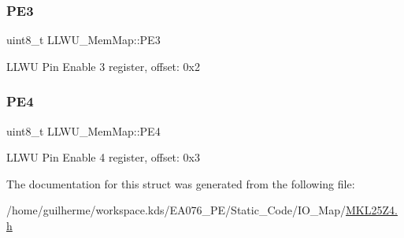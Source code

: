 \subsubsection{\texorpdfstring{P\+E3}{PE3}}
{\footnotesize\ttfamily uint8\+\_\+t L\+L\+W\+U\+\_\+\+Mem\+Map\+::\+P\+E3}

L\+L\+WU Pin Enable 3 register, offset\+: 0x2 \mbox{\label{struct_l_l_w_u___mem_map_a61ec3534039e161c5c71ea7f290f23d5}} 
\subsubsection{\texorpdfstring{P\+E4}{PE4}}
{\footnotesize\ttfamily uint8\+\_\+t L\+L\+W\+U\+\_\+\+Mem\+Map\+::\+P\+E4}

L\+L\+WU Pin Enable 4 register, offset\+: 0x3 

The documentation for this struct was generated from the following file\+:\begin{DoxyCompactItemize}
\item 
/home/guilherme/workspace.\+kds/\+E\+A076\+\_\+\+P\+E/\+Static\+\_\+\+Code/\+I\+O\+\_\+\+Map/\hyperlink{_m_k_l25_z4_8h}{M\+K\+L25\+Z4.\+h}\end{DoxyCompactItemize}
